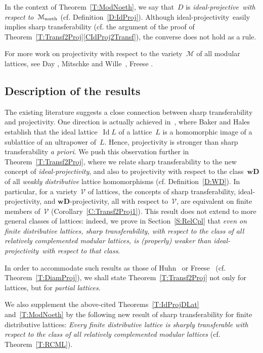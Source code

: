 \documentclass[reqno]{amsart}
\numberwithin{equation}{section}
\theoremstyle{plain}
\theoremstyle{definition}
\theoremstyle{remark}
\numberwithin{figure}{section}
\numberwithin{table}{section}
\begin{document}
In the context of Theorem~\ref{T:ModNoeth}, we say that~$D$ is \emph{{i\-de\-al-pro\-jec\-tive}\ with respect to~${{\mathcal{M}}_{\textup{n{\oe}th}}}$} (cf. Definition~\ref{D:IdProj}).
Although {i\-de\-al-pro\-jec\-tiv\-ity}\ easily implies sharp transferability (cf. the argument of the proof of Theorem~\ref{T:Transf2Proj}\eqref{CIdProj2Transf}), the converse does not hold as a rule.

For more work on projectivity with respect to the variety~${\mathcal{M}}$ of all modular lattices, see Day \cite{Day70,Day73,Day75}, Mitschke and Wille~\cite{MitWil76}, Freese \cite{Freese76,Fre79}.

\subsection{Description of the results}\label{Su:DescrRes}
The existing literature suggests a close connection between sharp transferability and projectivity.
One direction is actually achieved in~\cite{BakHal74}, where Baker and Hales establish that the ideal lattice~$\operatorname{Id} L$ of a lattice~$L$ is a homomorphic image of a sublattice of an ultrapower of~$L$.
Hence, projectivity is stronger than sharp transferability \emph{a priori}.
We push this observation further in Theorem~\ref{T:Transf2Proj}, where we relate sharp transferability to the new concept of \emph{i\-de\-al-pro\-jec\-tiv\-ity}, and also to projectivity with respect to the class~${\mathbf{wD}}$ of all \emph{weakly distributive} lattice homomorphisms (cf. Definition~\ref{D:WD}).
In particular, for a variety~${\mathcal{V}}$ of lattices, the concepts of sharp transferability, {i\-de\-al-pro\-jec\-tiv\-ity}, and ${\mathbf{wD}}$-projectivity, all with respect to~${\mathcal{V}}$, are equivalent on finite members of~${\mathcal{V}}$ (Corollary~\ref{C:Transf2Proj1}).
This result does not extend to more general classes of lattices:
indeed, we prove in Section~\ref{S:RelCpl} that \emph{even on finite distributive lattices, sharp transferability, with respect to the class of all relatively complemented modular lattices, is {\textup{(}{{properly}}\textup{)}} weaker than {i\-de\-al-pro\-jec\-tiv\-ity}\ with respect to that class}.

In order to accommodate such results as those of Huhn~\cite{Huhn72} or Freese~\cite{Freese76} (cf. Theorem~\ref{T:DiamProj}), we shall state Theorem~\ref{T:Transf2Proj} not only for lattices, but for \emph{partial lattices}.

We also supplement the above-cited Theorems~\ref{T:IdProjDLat} and~\ref{T:ModNoeth} by the following new result of sharp transferability for finite distributive lattices:
\emph{Every finite distributive lattice is sharply transferable with respect to the class of all relatively complemented modular lattices} (cf. Theorem~\ref{T:RCML}).
\end{document}
